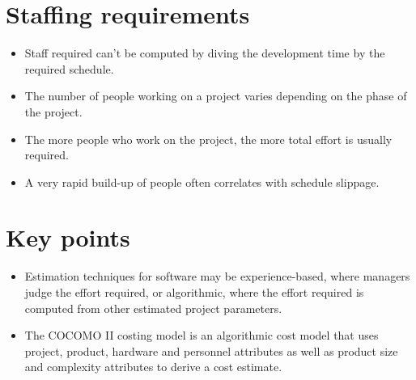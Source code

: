 \section{Staffing requirements}
\begin{itemize}

\item Staff required can’t be computed by diving the development time by the required schedule.

\item The number of people working on a project varies depending on the phase of the project.

\item The more people who work on the project, the more total effort is usually required.

\item A very rapid build-up of people often correlates with schedule slippage.
\end{itemize}
\section{Key points}
\begin{itemize}

\item Estimation techniques for software may be experience-based, where managers judge the effort required, or algorithmic, where the effort required is computed from other estimated project parameters.

\item The COCOMO II costing model is an algorithmic cost model that uses project, product, hardware and personnel attributes as well as product size and complexity attributes to derive a cost estimate.
\end{itemize}
